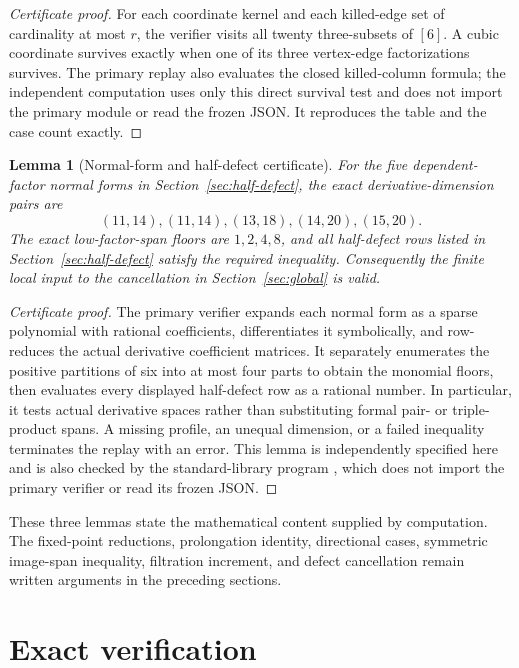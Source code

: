 \documentclass[11pt]{amsart}
\newtheorem{lemma}[theorem]{Lemma}
\theoremstyle{definition}
\begin{document}
\begin{proof}[Certificate proof]
For each coordinate kernel and each killed-edge set of cardinality at most
\(r\), the verifier visits all twenty three-subsets of \([6]\). A cubic
coordinate survives exactly when one of its three vertex-edge factorizations
survives. The primary replay also evaluates the closed killed-column formula;
the independent computation uses only this direct survival test and does not import
the primary module or read the frozen JSON. It reproduces the table and the
case count exactly.
\end{proof}

\begin{lemma}[Normal-form and half-defect certificate]
\label{lem:certificate-half-defect}
For the five dependent-factor normal forms in
Section~\ref{sec:half-defect}, the exact derivative-dimension pairs are
\[
 (11,14),(11,14),(13,18),(14,20),(15,20).
\]
The exact low-factor-span floors are \(1,2,4,8\), and all half-defect rows
listed in Section~\ref{sec:half-defect} satisfy the required inequality.
Consequently the finite
local input to the cancellation in Section~\ref{sec:global} is valid.
\end{lemma}

\begin{proof}[Certificate proof]
The primary verifier expands each normal form as a sparse polynomial with
rational coefficients, differentiates it symbolically, and row-reduces the
actual derivative coefficient matrices. It separately enumerates the positive
partitions of six into at most four parts to obtain the monomial floors, then
evaluates every displayed half-defect row as a rational number. In particular,
it tests actual derivative spaces rather than substituting formal pair- or
triple-product spans. A missing profile, an unequal dimension, or a failed
inequality terminates the replay with an error. This lemma is independently
specified here and is also checked by the standard-library program
, which does not import
the primary verifier or read its frozen JSON.
\end{proof}

These three lemmas state the mathematical content supplied by computation.
The fixed-point reductions, prolongation identity, directional cases,
symmetric image-span inequality, filtration increment, and defect cancellation
remain written arguments in the preceding sections.

\section{Exact verification}
\end{document}
